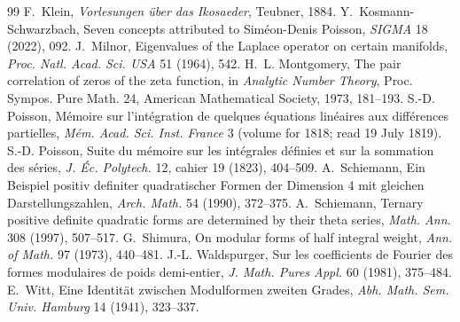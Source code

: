 \documentclass[11pt]{article}
\begin{document}
\begin{thebibliography}{99}
 F.~Klein, \emph{Vorlesungen \"uber das Ikosaeder}, Teubner, 1884.
 Y.~Kosmann-Schwarzbach, Seven concepts attributed to Sim\'eon-Denis Poisson, \emph{SIGMA} 18 (2022), 092.
 J.~Milnor, Eigenvalues of the Laplace operator on certain manifolds, \emph{Proc. Natl. Acad. Sci. USA} 51 (1964), 542.
 H.~L. Montgomery, The pair correlation of zeros of the zeta function, in \emph{Analytic Number Theory}, Proc. Sympos. Pure Math. 24, American Mathematical Society, 1973, 181--193.
 S.-D. Poisson, M\'emoire sur l'int\'egration de quelques \'equations lin\'eaires aux diff\'erences partielles, \emph{M\'em. Acad. Sci. Inst. France} 3 (volume for 1818; read 19 July 1819).
 S.-D. Poisson, Suite du m\'emoire sur les int\'egrales d\'efinies et sur la sommation des s\'eries, \emph{J. \'Ec. Polytech.} 12, cahier 19 (1823), 404--509.
 A.~Schiemann, Ein Beispiel positiv definiter quadratischer Formen der Dimension 4 mit gleichen Darstellungszahlen, \emph{Arch. Math.} 54 (1990), 372--375.
 A.~Schiemann, Ternary positive definite quadratic forms are determined by their theta series, \emph{Math. Ann.} 308 (1997), 507--517.
 G.~Shimura, On modular forms of half integral weight, \emph{Ann. of Math.} 97 (1973), 440--481.
 J.-L. Waldspurger, Sur les coefficients de Fourier des formes modulaires de poids demi-entier, \emph{J. Math. Pures Appl.} 60 (1981), 375--484.
 E.~Witt, Eine Identit\"at zwischen Modulformen zweiten Grades, \emph{Abh. Math. Sem. Univ. Hamburg} 14 (1941), 323--337.
\end{thebibliography}
\end{document}
